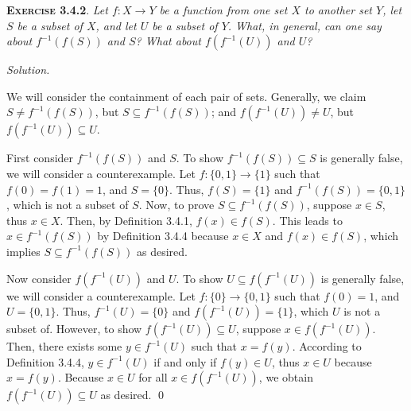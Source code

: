 \documentclass[12pt]{article}
\theoremstyle{remark}
\newenvironment{exer}[2]{
    \noindent \setlength{\parskip}{1em}%
    \textsc{\textbf{Exercise #1}}. \textit{#2} \par
    \noindent \textit{Solution.} %
}{\bigskip}
\begin{document}
\begin{exer}{3.4.2}{
    Let $f : X \to Y$ be a function from one set $X$ to another set $Y$, let $S$ be a subset of $X$, and let $U$ be a subset of $Y$.
    What, in general, can one say about $f^{-1}(f(S))$ and $S$?
    What about $f(f^{-1}(U))$ and $U$?
}
    We will consider the containment of each pair of sets.
    Generally, we claim $S \ne f^{-1}(f(S))$, but $S \subseteq f^{-1}(f(S))$; and $f(f^{-1}(U)) \ne U$, but $f(f^{-1}(U)) \subseteq U$.
    
    First consider $f^{-1}(f(S))$ and $S$.
    To show $f^{-1}(f(S)) \subseteq S$ is generally false, we will consider a counterexample.
    Let $f : \{ 0, 1 \} \to \{ 1 \}$ such that $f(0) = f(1) = 1$, and $S = \{ 0 \}$.
    Thus, $f(S) = \{ 1 \}$ and $f^{-1}(f(S)) = \{ 0, 1 \}$, which is not a subset of $S$.
    Now, to prove $S \subseteq f^{-1}(f(S))$, suppose $x \in S$, thus $x \in X$.
    Then, by Definition 3.4.1, $f(x) \in f(S)$.
    This leads to $x \in f^{-1}(f(S))$ by Definition 3.4.4 because $x \in X$ and $f(x) \in f(S)$, which implies $S \subseteq f^{-1}(f(S))$ as desired.

    Now consider $f(f^{-1}(U))$ and $U$.
    To show $U \subseteq f(f^{-1}(U))$ is generally false, we will consider a counterexample.
    Let $f : \{0 \} \to \{ 0, 1 \}$ such that $f(0) = 1$, and $U = \{ 0, 1 \}$.
    Thus, $f^{-1}(U) = \{ 0 \}$ and $f(f^{-1}(U)) = \{ 1 \}$, which $U$ is not a subset of.
    However, to show $f(f^{-1}(U)) \subseteq U$, suppose $x \in f(f^{-1}(U))$.
    Then, there exists some $y \in f^{-1}(U)$ such that $x = f(y)$.
    According to Definition 3.4.4, $y \in f^{-1}(U)$ if and only if $f(y) \in U$, thus $x \in U$ because $x = f(y)$.
    Because $x \in U$ for all $x \in f(f^{-1}(U))$, we obtain $f(f^{-1}(U)) \subseteq U$ as desired. \qed
\end{exer}
\end{document}

